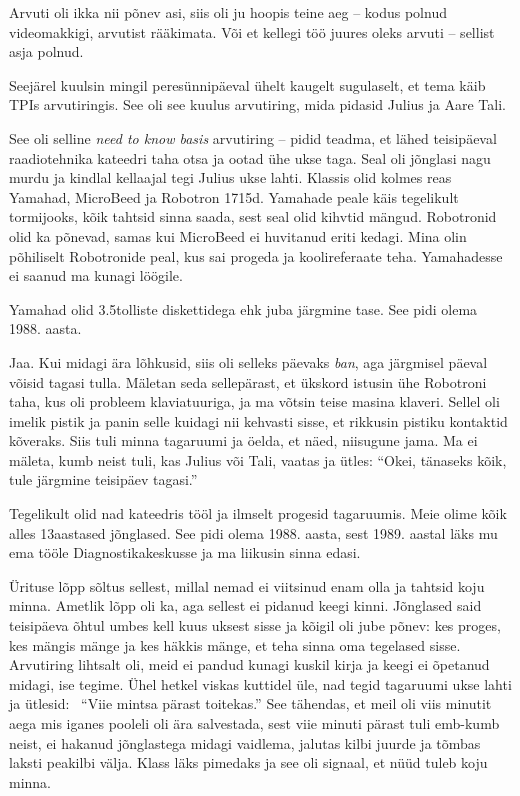 Arvuti oli ikka nii põnev asi, siis oli ju hoopis teine aeg -- kodus polnud 
videomakkigi, arvutist rääkimata. Või et kellegi töö juures oleks arvuti -- 
sellist asja polnud. 

Seejärel kuulsin mingil peresünnipäeval
ühelt kaugelt sugulaselt, et tema käib TPIs 
arvutiringis. See oli see kuulus 
arvutiring, mida pidasid Julius ja Aare Tali. 

See oli selline \emph{need to know 
basis} arvutiring -- pidid teadma, et lähed teisipäeval raadiotehnika 
kateedri taha otsa ja 
ootad ühe ukse taga. Seal oli jõnglasi nagu murdu ja 
kindlal kellaajal tegi Julius ukse lahti. Klassis olid kolmes reas
Yamahad, MicroBeed ja 
Robotron 1715d. Yamahade peale käis 
tegelikult tormijooks, kõik tahtsid sinna saada, sest seal olid 
kihvtid mängud. Robotronid olid ka põnevad, samas kui MicroBeed ei huvitanud eriti kedagi. Mina olin põhiliselt Robotronide peal, kus sai 
progeda ja koolireferaate teha. Yamahadesse ei saanud ma
kunagi löögile. 

Yamahad olid 3.5tolliste diskettidega ehk juba järgmine tase. See pidi olema 1988. aasta.


Jaa. Kui midagi ära lõhkusid, siis oli selleks päevaks \emph{ban}, aga järgmisel 
päeval võisid tagasi tulla. Mäletan seda sellepärast, et ükskord istusin 
ühe Robotroni taha, kus oli probleem klaviatuuriga, ja ma võtsin teise 
masina klaveri. Sellel oli imelik pistik ja panin selle kuidagi nii kehvasti sisse, et rikkusin pistiku kontaktid kõveraks. Siis tuli minna tagaruumi 
ja öelda, et näed, niisugune jama. Ma ei mäleta, kumb neist tuli, kas Julius 
või Tali, vaatas ja ütles: \enquote{Okei, tänaseks kõik, tule järgmine 
teisipäev tagasi.} 

Tegelikult olid nad kateedris tööl ja ilmselt progesid tagaruumis. Meie 
olime kõik alles 13aastased jõnglased. 
See pidi olema 1988. aasta, sest 1989. aastal läks mu ema tööle 
Diagnostikakeskusse ja 
ma liikusin sinna edasi. 

Ürituse lõpp sõltus sellest, millal nemad ei viitsinud enam olla ja tahtsid 
koju minna. Ametlik lõpp oli ka, aga sellest ei pidanud keegi 
kinni. Jõnglased said teisipäeva õhtul umbes kell kuus uksest sisse ja kõigil oli jube 
põnev: kes proges, kes mängis mänge ja kes häkkis mänge, et teha 
sinna oma tegelased sisse. Arvutiring lihtsalt oli, meid ei pandud 
kunagi kuskil kirja ja keegi ei õpetanud midagi, ise tegime. Ühel hetkel 
viskas kuttidel üle, nad tegid tagaruumi ukse lahti ja ütlesid: 
\enquote{Viie mintsa pärast toitekas.} See tähendas, et meil oli viis minutit aega mis 
iganes pooleli oli ära salvestada, sest viie minuti pärast tuli emb-kumb neist, ei hakanud jõnglastega midagi vaidlema, jalutas kilbi juurde ja 
tõmbas laksti peakilbi välja. Klass läks pimedaks ja see oli signaal, et nüüd tuleb koju 
minna.


